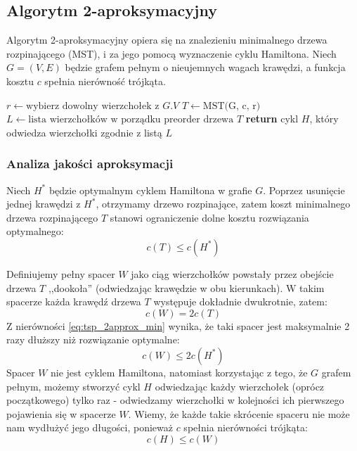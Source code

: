 \documentclass{article}
\theoremstyle{definition}
\theoremstyle{plain}
\theoremstyle{remark}
\begin{document}
	\subsection{Algorytm 2-aproksymacyjny}
	Algorytm 2-aproksymacyjny opiera się na znalezieniu minimalnego drzewa rozpinającego (MST), i za jego pomocą wyznaczenie cyklu Hamiltona. Niech $G = (V, E)$ będzie grafem pełnym o nieujemnych wagach krawędzi, a funkcja kosztu $c$ spełnia nierówność trójkąta.
	
	\begin{algorithm}
		\caption{Algorytm 2-aproksymacyjny(G, c)}
		\label{alg:tsp_2approx}
		\begin{algorithmic}[1]
			\State $r \gets \text{wybierz dowolny wierzchołek z } G.V$
			\State $T \gets \text{MST(G, c, r)}$ 
			\State $L \gets \text{lista wierzchołków w porządku preorder drzewa } T$
			\State \textbf{return} cykl $H$, który odwiedza wierzchołki zgodnie z listą $L$
		\end{algorithmic}
	\end{algorithm}
	
	\subsubsection{Analiza jakości aproksymacji}
	Niech $H^*$ będzie optymalnym cyklem Hamiltona w grafie $G$. Poprzez usunięcie jednej krawędzi z $H^*$, otrzymamy drzewo rozpinające, zatem koszt minimalnego drzewa rozpinającego $T$ stanowi ograniczenie dolne kosztu rozwiązania optymalnego:
	\begin{equation}
		c(T) \leq c(H^*)
		\label{eq:tsp_2approx_min}
	\end{equation}
	
	Definiujemy pełny spacer $W$ jako ciąg wierzchołków powstały przez obejście drzewa $T$ ,,dookoła'' (odwiedzając krawędzie w obu kierunkach). W takim spacerze każda krawędź drzewa $T$ występuje dokładnie dwukrotnie, zatem:
	\begin{equation}
		c(W) = 2c(T)
	\end{equation}
	Z nierówności \ref{eq:tsp_2approx_min} wynika, że taki spacer jest maksymalnie 2 razy dłuższy niż rozwiązanie optymalne:
	\begin{equation}
		c(W) \leq 2c(H^*)
	\end{equation}
	Spacer $W$ nie jest cyklem Hamiltona, natomiast korzystając z tego, że $G$ grafem pełnym, możemy stworzyć cykl $H$ odwiedzając każdy wierzchołek (oprócz początkowego) tylko raz - odwiedzamy wierzchołki w kolejności ich pierwszego pojawienia się w spacerze $W$. Wiemy, że każde takie skrócenie spaceru nie może nam wydłużyć jego długości, ponieważ $c$ spełnia nierówności trójkąta:
	\begin{equation}
		c(H) \leq c(W)
	\end{equation} 
\end{document}
